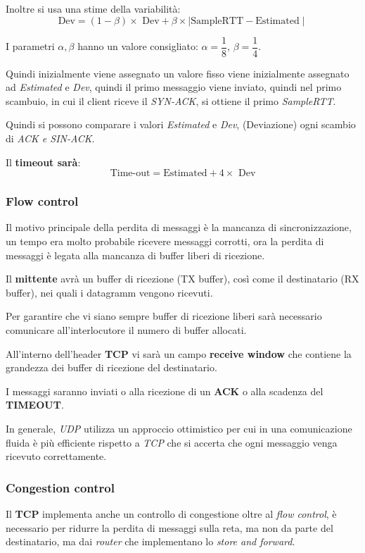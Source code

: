 Inoltre si usa una stime della variabilità:
\[
  \text{Dev}=(1-\beta)\times\text{ Dev}+\beta\times\mid\text{SampleRTT}-
  \text{Estimated}\mid
\]

I parametri $\alpha,\beta$ hanno un valore consigliato: $\alpha=\dfrac{1}{8}$,
$\beta=\dfrac{1}{4}$.

Quindi inizialmente viene assegnato un valore fisso viene inizialmente
assegnato ad \emph{Estimated} e \emph{Dev}, quindi il primo messaggio viene
inviato, quindi nel primo scambuio, in cui il client riceve il \emph{SYN-ACK},
si ottiene il primo \emph{SampleRTT}.

Quindi si possono comparare i valori \emph{Estimated} e \emph{Dev},
(Deviazione) ogni scambio di \emph{ACK e SIN-ACK}.

Il \textbf{timeout sarà}:
\[
  \text{Time-out}=\text{Estimated}+4\times\text{ Dev}
\]

\subsubsection{Flow control}
Il motivo principale della perdita di messaggi è la mancanza di
sincronizzazione, un tempo era molto probabile ricevere messaggi corrotti,
ora la perdita di messaggi è legata alla mancanza di buffer liberi di
ricezione.

Il \textbf{mittente} avrà un buffer di ricezione (TX buffer), così come
il destinatario (RX buffer), nei quali i datagramm vengono ricevuti.

Per garantire che vi siano sempre buffer di ricezione liberi sarà necessario
comunicare all'interlocutore il numero di buffer allocati.

All'interno dell'header \textbf{TCP} vi sarà un campo \textbf{receive window}
che contiene la grandezza dei buffer di ricezione del destinatario.

I messaggi saranno inviati o alla ricezione di un \textbf{ACK} o alla scadenza
del \textbf{TIMEOUT}.

In generale, \emph{UDP} utilizza un approccio ottimistico per cui in una
comunicazione fluida è più efficiente rispetto a \emph{TCP} che si accerta
che ogni messaggio venga ricevuto correttamente.

\subsubsection{Congestion control}
Il \textbf{TCP} implementa anche un controllo di congestione oltre al \emph{
flow control}, è necessario per ridurre la perdita di messaggi sulla reta,
ma non da parte del destinatario, ma dai \emph{router} che implementano lo
\emph{store and forward}.


